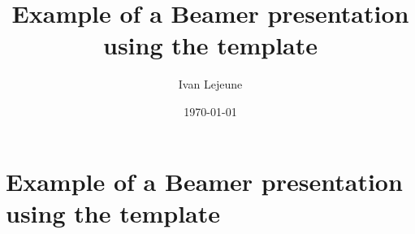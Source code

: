 




\title[Example-file-name]{Example of a Beamer presentation using the template}
\author{Ivan Lejeune}
\date{\today}



\frame{\titlepage}

\section{Example of a Beamer presentation using the template}



